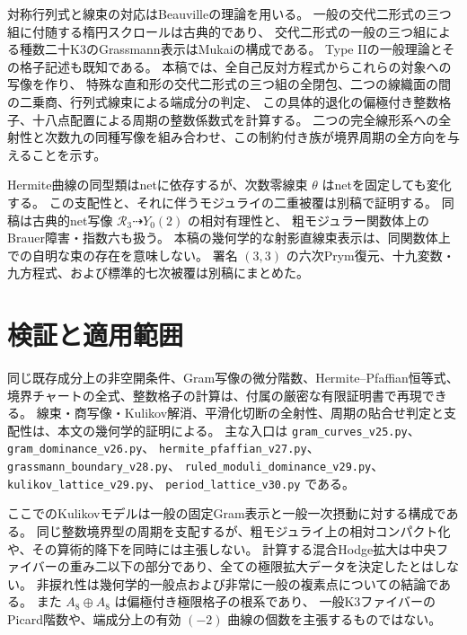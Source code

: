 対称行列式と線束の対応はBeauvilleの理論を用いる\cite{BeauvilleDeterminantal}。
一般の交代二形式の三つ組に付随する楕円スクロールは古典的であり\cite{BazanMezzetti}、
交代二形式の一般の三つ組による種数二十K3のGrassmann表示はMukaiの構成である\cite{MukaiGenus20}。
Type IIの一般理論とその格子記述も既知である\cite{KulikovDegenerations,PerssonPinkhamDegenerations,KondoTypeII}。
本稿では、全自己反対方程式からこれらの対象への写像を作り、
特殊な直和形の交代二形式の三つ組の全閉包、二つの線織面の間の二乗商、行列式線束による端成分の判定、
この具体的退化の偏極付き整数格子、十八点配置による周期の整数係数式を計算する。
二つの完全線形系への全射性と次数九の同種写像を組み合わせ、この制約付き族が境界周期の全方向を与えることを示す。

Hermite曲線の同型類はnetに依存するが、次数零線束 $\theta$ はnetを固定しても変化する。
この支配性と、それに伴うモジュライの二重被覆は別稿\cite{PaperVI}で証明する。
同稿は古典的net写像 $\mathcal R_3\dashrightarrow Y_0(2)$ の相対有理性と、
粗モジュラー関数体上のBrauer障害・指数六も扱う。
本稿の幾何学的な射影直線束表示は、同関数体上での自明な束の存在を意味しない。
署名 $(3,3)$ の六次Prym復元、十九変数・九方程式、および標準的七次被覆は別稿\cite{PaperVII}にまとめた。















\section{検証と適用範囲}
同じ既存成分上の非空開条件、Gram写像の微分階数、Hermite--Pfaffian恒等式、
境界チャートの全式、整数格子の計算は、付属の厳密な有限証明書で再現できる。
線束・商写像・Kulikov解消、平滑化切断の全射性、周期の貼合せ判定と支配性は、本文の幾何学的証明による。
主な入口は \nolinkurl{gram_curves_v25.py}、\nolinkurl{gram_dominance_v26.py}、
\nolinkurl{hermite_pfaffian_v27.py}、\nolinkurl{grassmann_boundary_v28.py}、
\nolinkurl{ruled_moduli_dominance_v29.py}、\nolinkurl{kulikov_lattice_v29.py}、
\nolinkurl{period_lattice_v30.py} である。

ここでのKulikovモデルは一般の固定Gram表示と一般一次摂動に対する構成である。
同じ整数境界型の周期を支配するが、粗モジュライ上の相対コンパクト化や、その算術的降下を同時には主張しない。
計算する混合Hodge拡大は中央ファイバーの重み二以下の部分であり、全ての極限拡大データを決定したとはしない。
非捩れ性は幾何学的一般点および非常に一般の複素点についての結論である。
また $A_8\oplus A_8$ は偏極付き極限格子の根系であり、
一般K3ファイバーのPicard階数や、端成分上の有効 $(-2)$ 曲線の個数を主張するものではない。


